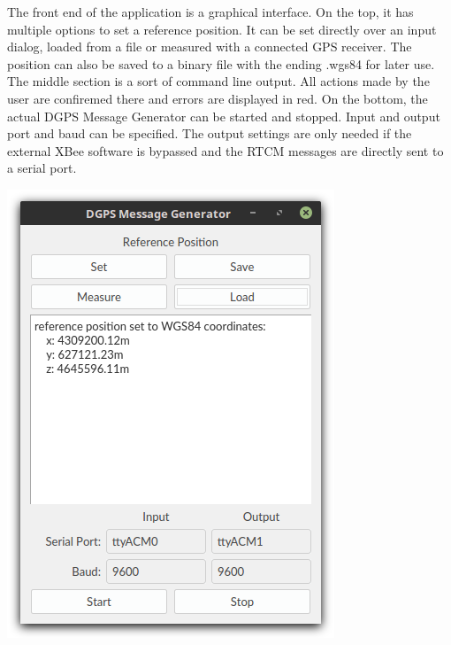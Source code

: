 \begin{minipage}{0.5\textwidth}
 The front end of the application is a graphical interface.
 On the top, it has multiple options to set a reference position.
 It can be set directly over an input dialog, loaded from a file or measured with a connected GPS receiver.
 The position can also be saved to a binary file with the ending .wgs84 for later use.
 The middle section is a sort of command line output.
 All actions made by the user are confiremed there and errors are displayed in red.
 On the bottom, the actual DGPS Message Generator can be started and stopped.
 Input and output port and baud can be specified.
 The output settings are only needed if the external XBee software is bypassed and the RTCM messages are directly sent to a serial port.
\end{minipage}
\hfill
\begin{minipage}{0.45\textwidth}
 \centering
 \includegraphics[width=\textwidth]{images/GUI.png}
 \label{fig:gui}
\end{minipage}

